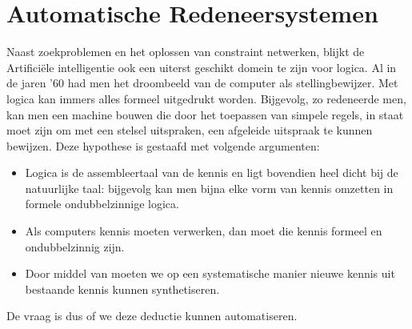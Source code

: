 \section{Automatische Redeneersystemen}
\label{s:automaticReasoning}
Naast zoekproblemen en het oplossen van constraint netwerken, blijkt de Artificiële intelligentie ook een uiterst geschikt domein te zijn voor logica. Al in de jaren '60 had men het droombeeld van de computer als stellingbewijzer. Met logica kan immers alles formeel uitgedrukt worden. Bijgevolg, zo redeneerde men, kan men een machine bouwen die door het toepassen van simpele regels, in staat moet zijn om met een stelsel uitspraken, een afgeleide uitspraak te kunnen bewijzen. Deze hypothese is gestaafd met volgende argumenten:
\begin{itemize}
 \item Logica is de assembleertaal van de kennis en ligt bovendien heel dicht bij de natuurlijke taal: bijgevolg kan men bijna elke vorm van kennis omzetten in formele ondubbelzinnige logica.
 \item Als computers kennis moeten verwerken, dan moet die kennis formeel en ondubbelzinnig zijn.
 \item Door middel van  moeten we op een systematische manier nieuwe kennis uit bestaande kennis kunnen synthetiseren.
\end{itemize}
De vraag is dus of we deze deductie kunnen automatiseren.
